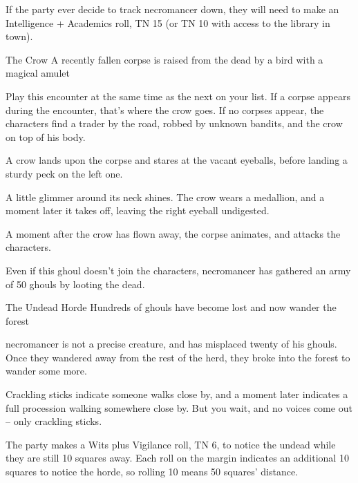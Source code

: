 \begin{multicols}{2}
If the party ever decide to track \gls{necromancer} down, they will need to make an Intelligence + Academics roll, TN 15 (or TN 10 with access to the library in town).

{The Crow}%
{A recently fallen corpse is raised from the dead by a bird with a magical amulet}%

Play this encounter at the same time as the next on your list.
If a corpse appears during the encounter, that's where the crow goes.
If no corpses appear, the characters find a trader by the road, robbed by unknown bandits, and the crow on top of his body.

\begin{boxtext}
	A crow lands upon the corpse and stares at the vacant eyeballs, before landing a sturdy peck on the left one.

	A little glimmer around its neck shines.  The crow wears a medallion, and a moment later it takes off, leaving the right eyeball undigested.

\end{boxtext}

A moment after the crow has flown away, the corpse animates, and attacks the characters.


Even if this ghoul doesn't join the characters, \gls{necromancer} has gathered an army of 50 ghouls by looting the dead.

{The Undead Horde}%
{Hundreds of ghouls have become lost and now wander the forest}%

\Gls{necromancer} is not a precise creature, and has misplaced twenty of his ghouls.
Once they wandered away from the rest of the herd, they broke into the forest to wander some more.

\begin{boxtext}

	Crackling sticks indicate someone walks close by, and a moment later indicates a full procession walking somewhere close by.
	But you wait, and no voices come out -- only crackling sticks.

\end{boxtext}

The party makes a Wits plus Vigilance roll, TN 6, to notice the undead while they are still 10 squares away.
Each roll on the margin indicates an additional 10 squares to notice the horde, so rolling 10 means 50 squares' distance.


\end{multicols}
